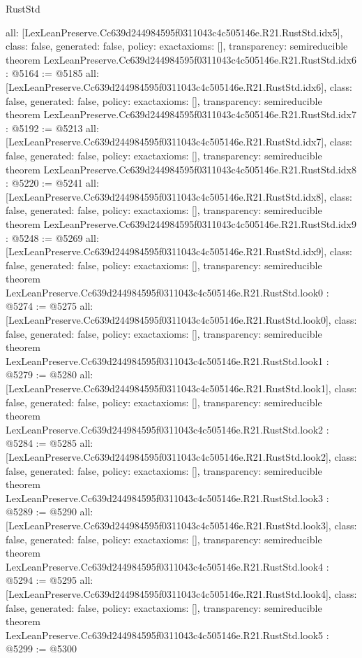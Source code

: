 \begin{lexlean}{RustStd}
\begin{coremodule}
{  all: [LexLeanPreserve.Cc639d244984595f0311043c4c505146e.R21.RustStd.idx5],
  class: false,
  generated: false,
  policy: exact{axioms: []},
  transparency: semireducible
}
theorem LexLeanPreserve.Cc639d244984595f0311043c4c505146e.R21.RustStd.idx6 : @5164 := @5185 {
  all: [LexLeanPreserve.Cc639d244984595f0311043c4c505146e.R21.RustStd.idx6],
  class: false,
  generated: false,
  policy: exact{axioms: []},
  transparency: semireducible
}
theorem LexLeanPreserve.Cc639d244984595f0311043c4c505146e.R21.RustStd.idx7 : @5192 := @5213 {
  all: [LexLeanPreserve.Cc639d244984595f0311043c4c505146e.R21.RustStd.idx7],
  class: false,
  generated: false,
  policy: exact{axioms: []},
  transparency: semireducible
}
theorem LexLeanPreserve.Cc639d244984595f0311043c4c505146e.R21.RustStd.idx8 : @5220 := @5241 {
  all: [LexLeanPreserve.Cc639d244984595f0311043c4c505146e.R21.RustStd.idx8],
  class: false,
  generated: false,
  policy: exact{axioms: []},
  transparency: semireducible
}
theorem LexLeanPreserve.Cc639d244984595f0311043c4c505146e.R21.RustStd.idx9 : @5248 := @5269 {
  all: [LexLeanPreserve.Cc639d244984595f0311043c4c505146e.R21.RustStd.idx9],
  class: false,
  generated: false,
  policy: exact{axioms: []},
  transparency: semireducible
}
theorem LexLeanPreserve.Cc639d244984595f0311043c4c505146e.R21.RustStd.look0 : @5274 := @5275 {
  all: [LexLeanPreserve.Cc639d244984595f0311043c4c505146e.R21.RustStd.look0],
  class: false,
  generated: false,
  policy: exact{axioms: []},
  transparency: semireducible
}
theorem LexLeanPreserve.Cc639d244984595f0311043c4c505146e.R21.RustStd.look1 : @5279 := @5280 {
  all: [LexLeanPreserve.Cc639d244984595f0311043c4c505146e.R21.RustStd.look1],
  class: false,
  generated: false,
  policy: exact{axioms: []},
  transparency: semireducible
}
theorem LexLeanPreserve.Cc639d244984595f0311043c4c505146e.R21.RustStd.look2 : @5284 := @5285 {
  all: [LexLeanPreserve.Cc639d244984595f0311043c4c505146e.R21.RustStd.look2],
  class: false,
  generated: false,
  policy: exact{axioms: []},
  transparency: semireducible
}
theorem LexLeanPreserve.Cc639d244984595f0311043c4c505146e.R21.RustStd.look3 : @5289 := @5290 {
  all: [LexLeanPreserve.Cc639d244984595f0311043c4c505146e.R21.RustStd.look3],
  class: false,
  generated: false,
  policy: exact{axioms: []},
  transparency: semireducible
}
theorem LexLeanPreserve.Cc639d244984595f0311043c4c505146e.R21.RustStd.look4 : @5294 := @5295 {
  all: [LexLeanPreserve.Cc639d244984595f0311043c4c505146e.R21.RustStd.look4],
  class: false,
  generated: false,
  policy: exact{axioms: []},
  transparency: semireducible
}
theorem LexLeanPreserve.Cc639d244984595f0311043c4c505146e.R21.RustStd.look5 : @5299 := @5300 {
}
\end{coremodule}
\end{lexlean}
